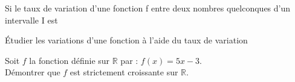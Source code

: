\vspace*{-0.6cm}
\begin{bprops}
	\begin{itemProp}
		\item Si le taux de variation d’une fonction f entre deux nombres quelconques d’un intervalle I est
		\pointille[\textwidth-1cm]
		\item {}\pointille[\textwidth-1cm]
		\item {}\pointille[\textwidth-1cm]
	\end{itemProp}
\end{bprops}

\vspace*{-0.3cm}
\begin{bmethodet}{Étudier les variations d'une fonction à l'aide du taux de variation}
	\vspace*{-0.2cm}
	
	Soit \(f\) la fonction définie sur \(\mathbb{R}\) par : \(f(x)=5 x-3\).\\
	Démontrer que \(f\) est strictement croissante sur \(\mathbb{R}\).
	
	
	\pointille[\textwidth]
	\pointille[\textwidth]
	\pointille[\textwidth]
	\pointille[\textwidth]
\end{bmethodet}
